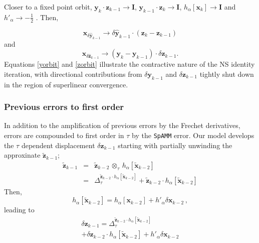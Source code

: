 \documentclass[letterpaper,twocolumn,amsmath,amsfont,amssymb,english,aps,jcp,preprintnumbers,groupaddress,nofootinbib,tightenlines]{revtex4}
\newcommand{\mat}[1]{\boldsymbol{#1}}
\newcommand{\ot}{ {\scriptstyle \otimes}_{ \tau } }
\begin{document}
Closer to a fixed point orbit,  $\mat{y}_k \cdot \mat{z}_{k-1} \rightarrow \mat{I}$, $\mat{y}_{k-1} \cdot \mat{z}_{k} \rightarrow \mat{I}$, 
$h_\alpha \left[ \mat{x}_{k} \right] \rightarrow \mat{I}$ and $h'_\alpha \rightarrow - \frac{1}{2}$ \cite{higham2005}.  Then,

\begin{equation} \label{yorbit}
 \mat{x}_{\delta \widehat{ \mat{y}}_{k-1}} \rightarrow \delta \widehat{\mat{y}}_{k-1} \cdot \left( \mat{z}_k-\mat{z}_{k-1} \right)
\end{equation}
and 
\begin{equation} \label{zorbit}
 \mat{x}_{\delta \widehat{ \mat{z}}_{k-1}} \rightarrow \left( \mat{y}_k-\mat{y}_{k-1} \right) \cdot \delta \widehat{\mat{z}}_{k-1} .
\end{equation}
Equations \ref{yorbit} and  \ref{zorbit} illustrate the contractive nature of the NS identity iteration, with directional 
contributions from $\delta \mat{y}_{k-1}$ and $\delta \mat{z}_{k-1}$ tightly shut down in the region of superlinear convergence.

\subsubsection{Previous errors to first order}

In addition to the amplification of previous errors by the Frechet derivatives, errors are compounded to first order in $\tau$
by the {\tt SpAMM} error.  Our model develops the $\tau$  dependent displacement $\delta \mat{z}_{k-1}$ starting with partially unwinding
the approxinate  $\widetilde{\mat{z}}_{k-1}$;
\begin{eqnarray}
 \widetilde{\mat{z}}_{k-1} &=&  \widetilde{\mat{z}}_{k-2}  \, \ot \, h_\alpha[\widetilde{\mat{x}}_{k-2}]\\
&=& \Delta^{\widetilde{\mat{z}}_{k-2} \cdot h_\alpha \left[ \widetilde{\mat{x}}_{k-2}\right]}_\tau 
+ \widetilde{\mat{z}}_{k-2} \cdot h_\alpha\left[ \widetilde{\mat{x}}_{k-2}\right]  
\end{eqnarray}
Then, 
\begin{equation}
  h_\alpha \left[ \widetilde{\mat{x}}_{k-2} \right]  
=  h_\alpha \left[ \mat{x}_{k-2} \right] +  h'_\alpha  \delta \mat{x}_{k-2} \,  ,
\end{equation}
leading to
\begin{multline}
 \delta {\mat{z}}_{k-1} =\Delta^{\widetilde{\mat{z}}_{k-2} \cdot h_\alpha \left[ \widetilde{\mat{x}}_{k-2}\right]}_\tau 
\\ +\delta \mat{z}_{k-2} \cdot h_\alpha \left[\widetilde{\mat{x}}_{k-2} \right]  
+ h'_\alpha \delta \mat{x}_{k-2} 
\end{multline}
\end{document}
